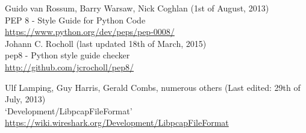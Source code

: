 \documentclass[10pt,a4paper,notitlepage,twoside]{report}
\begin{document}
\begin{thebibliography}{99}
	Guido van Rossum, Barry Warsaw, Nick Coghlan (1st of August, 2013)\\
	PEP 8 - Style Guide for Python Code\\
	\url{https://www.python.org/dev/peps/pep-0008/}\\
	
	Johann C. Rocholl (last updated 18th of March, 2015)\\
	pep8 - Python style guide checker\\
	\url{http://github.com/jcrocholl/pep8/}

	Ulf Lamping, Guy Harris, Gerald Combs, numerous others (Last edited: 29th of July, 2013)\\
	`Development/LibpcapFileFormat'\\
	\url{https://wiki.wireshark.org/Development/LibpcapFileFormat}

\end{thebibliography}
\end{document}
